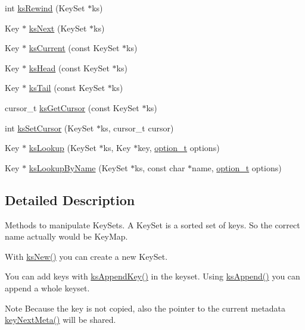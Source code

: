\begin{DoxyCompactItemize}
\item 
int \hyperlink{group__keyset_gabe793ff51f1728e3429c84a8a9086b70}{ks\-Rewind} (Key\-Set $\ast$ks)
\item 
Key $\ast$ \hyperlink{group__keyset_ga317321c9065b5a4b3e33fe1c399bcec9}{ks\-Next} (Key\-Set $\ast$ks)
\item 
Key $\ast$ \hyperlink{group__keyset_ga4287b9416912c5f2ab9c195cb74fb094}{ks\-Current} (const Key\-Set $\ast$ks)
\item 
Key $\ast$ \hyperlink{group__keyset_gae7dbf3aef70e67b5328475eb3d1f92f5}{ks\-Head} (const Key\-Set $\ast$ks)
\item 
Key $\ast$ \hyperlink{group__keyset_gadca442c4ab43cf532b15091d7711559e}{ks\-Tail} (const Key\-Set $\ast$ks)
\item 
cursor\-\_\-t \hyperlink{group__keyset_gaffe507ab9281c322eb16c3e992075d29}{ks\-Get\-Cursor} (const Key\-Set $\ast$ks)
\item 
int \hyperlink{group__keyset_gad94c9ffaa3e8034564c0712fd407c345}{ks\-Set\-Cursor} (Key\-Set $\ast$ks, cursor\-\_\-t cursor)
\item 
Key $\ast$ \hyperlink{group__keyset_gaa34fc43a081e6b01e4120daa6c112004}{ks\-Lookup} (Key\-Set $\ast$ks, Key $\ast$key, \hyperlink{group__kdb_ga98a3d6a4016c9dad9cbd1a99a9c2a45a}{option\-\_\-t} options)
\item 
Key $\ast$ \hyperlink{group__keyset_gad2e30fb6d4739d917c5abb2ac2f9c1a1}{ks\-Lookup\-By\-Name} (Key\-Set $\ast$ks, const char $\ast$name, \hyperlink{group__kdb_ga98a3d6a4016c9dad9cbd1a99a9c2a45a}{option\-\_\-t} options)
\end{DoxyCompactItemize}


\subsection{Detailed Description}
Methods to manipulate Key\-Sets. A Key\-Set is a sorted set of keys. So the correct name actually would be Key\-Map.

With \hyperlink{group__keyset_ga671e1aaee3ae9dc13b4834a4ddbd2c3c}{ks\-New()} you can create a new Key\-Set.

You can add keys with \hyperlink{group__keyset_gaa5a1d467a4d71041edce68ea7748ce45}{ks\-Append\-Key()} in the keyset. Using \hyperlink{group__keyset_ga21eb9c3a14a604ee3a8bdc779232e7b7}{ks\-Append()} you can append a whole keyset.

\begin{DoxyNote}{Note}
Because the key is not copied, also the pointer to the current metadata \hyperlink{group__keymeta_ga4c88342f580a4291455a801af71ce048}{key\-Next\-Meta()} will be shared. 
\end{DoxyNote}


